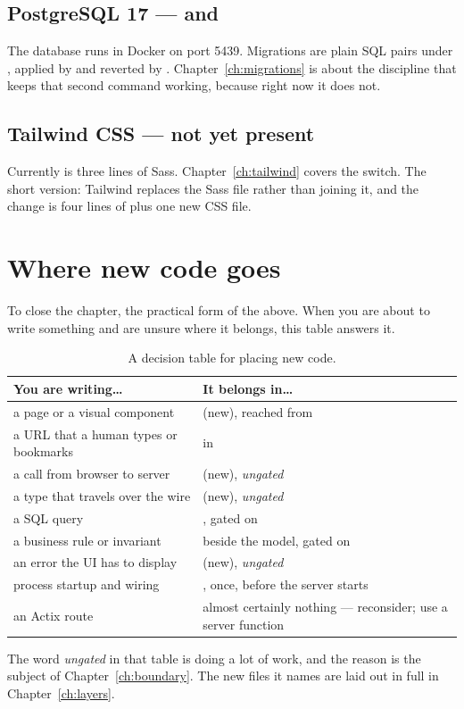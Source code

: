 \subsection*{PostgreSQL 17 --- and }

The database runs in Docker on port 5439. Migrations are plain SQL pairs under
, applied by  and reverted by
. Chapter~\ref{ch:migrations} is about the discipline that keeps
that second command working, because right now it does not.

\subsection*{Tailwind CSS --- not yet present}

Currently  is three lines of Sass. Chapter~\ref{ch:tailwind} covers the
switch. The short version: Tailwind replaces the Sass file rather than joining it, and the change
is four lines of  plus one new CSS file.

\section{Where new code goes}

To close the chapter, the practical form of the above. When you are about to write something and
are unsure where it belongs, this table answers it.

\begin{table}[htbp]
\centering
\caption{A decision table for placing new code.}
\label{tab:placement}
\small
\begin{tabular}{@{}L{0.40\textwidth}L{0.54\textwidth}@{}}
\toprule
\textbf{You are writing\ldots} & \textbf{It belongs in\ldots} \\
\midrule
a page or a visual component &  (new), reached from  \\
a URL that a human types or bookmarks &  in  \\
a call from browser to server &  (new), \emph{ungated} \\
a type that travels over the wire &  (new), \emph{ungated} \\
a SQL query & , gated on  \\
a business rule or invariant &  beside the model, gated on  \\
an error the UI has to display &  (new), \emph{ungated} \\
process startup and wiring & , once, before the server starts \\
an Actix route & almost certainly nothing --- reconsider; use a server function \\
\bottomrule
\end{tabular}
\end{table}

The word \emph{ungated} in that table is doing a lot of work, and the reason is the subject of
Chapter~\ref{ch:boundary}. The new files it names are laid out in full in Chapter~\ref{ch:layers}.
